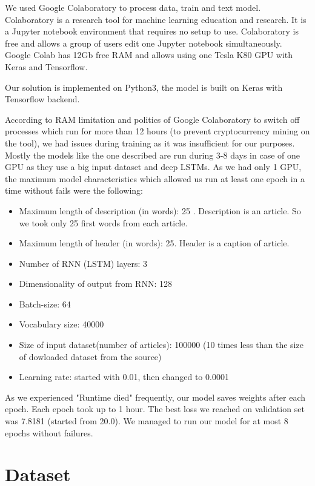 We used Google Colaboratory to process data, train and text model. Colaboratory is a research tool for machine learning education and research. It is a Jupyter notebook environment that requires no setup to use. 
Colaboratory is free and allows a group of users edit one Jupyter notebook simultaneously. Google Colab has 12Gb free RAM and allows using one Tesla K80 GPU with Keras and Tensorflow.

Our solution is implemented on Python3, the model is built on Keras with Tensorflow backend. 

According to RAM limitation and politics of Google Colaboratory to switch off processes which run for more than 12 hours (to prevent cryptocurrency mining on the tool), we had issues during training as it was insufficient for our purposes. Mostly the models like the one described are run during 3-8 days in case of one GPU as they use a big input dataset and deep LSTMs. As we had only 1 GPU, the maximum model characteristics which allowed us run at least one epoch in a time without fails were the following:

\begin{itemize}
\item Maximum length of description (in words): 25 . Description is an article. So we took only 25 first words from each article. 
\item Maximum length of header (in words): 25. Header is a caption of article.
\item Number of RNN (LSTM) layers: 3
\item Dimensionality of output from RNN: 128
\item Batch-size: 64
\item Vocabulary size: 40000
\item Size of input dataset(number of articles): 100000 (10 times less than the size of dowloaded dataset from the source)
\item Learning rate: started with 0.01, then changed to 0.0001
\end{itemize}

As we experienced "Runtime died" frequently, our model saves weights after each epoch. Each epoch took up to 1 hour. The best loss we reached on validation set was 7.8181 (started from 20.0). We managed to run our model for at most 8 epochs without failures.

\section{Dataset}
